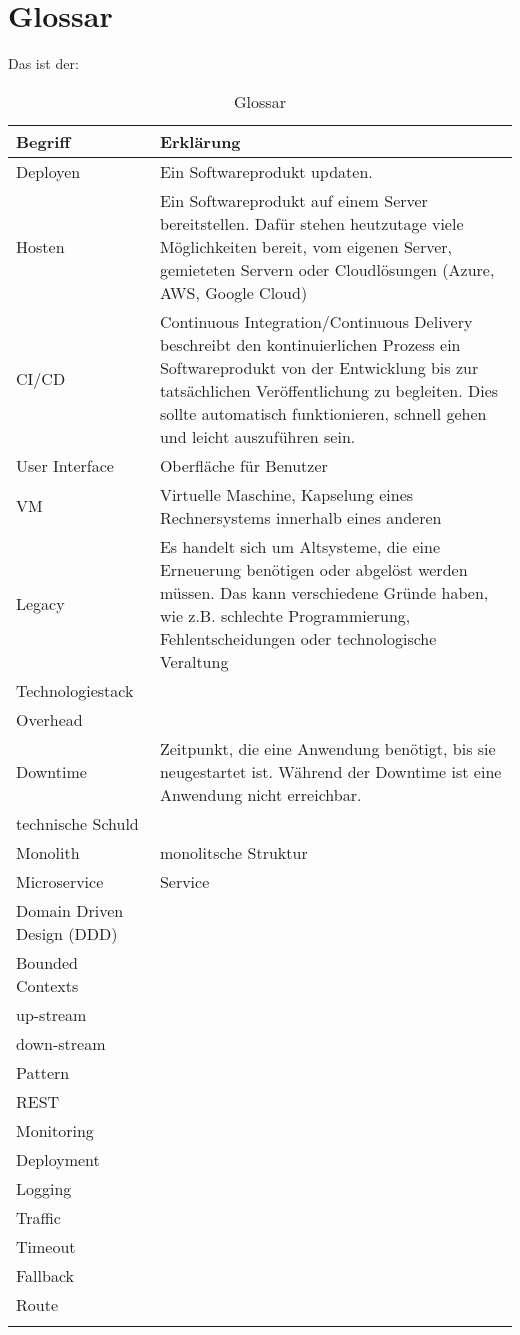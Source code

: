 \section{Glossar}

Das ist der:

	\begin{longtable}[center]{lp{10cm}}
				Begriff & Erklärung \\ \hline
				Deployen & Ein Softwareprodukt updaten.  \\
				Hosten & Ein Softwareprodukt auf einem Server bereitstellen. Dafür stehen heutzutage viele Möglichkeiten bereit, vom eigenen Server, gemieteten Servern oder Cloudlösungen (Azure, AWS, Google Cloud) \\
				CI/CD & Continuous Integration/Continuous Delivery beschreibt den kontinuierlichen Prozess ein Softwareprodukt von der Entwicklung bis zur tatsächlichen Veröffentlichung zu begleiten. Dies sollte automatisch funktionieren, schnell gehen und leicht auszuführen sein.  \\
				User Interface  & Oberfläche für Benutzer  \\
				VM & Virtuelle Maschine, Kapselung eines Rechnersystems innerhalb eines anderen  \\
				Legacy & Es handelt sich um Altsysteme, die eine Erneuerung benötigen oder abgelöst werden müssen. Das kann verschiedene Gründe haben, wie z.B. schlechte Programmierung, Fehlentscheidungen oder technologische Veraltung   \\
				Technologiestack &   \\
				Overhead &   \\
				Downtime & Zeitpunkt, die eine Anwendung benötigt, bis sie neugestartet ist. Während der Downtime ist eine Anwendung nicht erreichbar.  \\
				technische Schuld &   \\
				Monolith & monolitsche Struktur \\
				Microservice & Service  \\	
				Domain Driven Design (DDD) &  \\	
				Bounded Contexts & \\
				up-stream & \\
				down-stream & \\
				Pattern & \\
				REST & \\
				Monitoring & \\
				Deployment & \\
				Logging & \\
				Traffic & \\
				Timeout & \\
				Fallback & \\
				Route & \\
		\caption[Glossar]{Glossar}
	\end{longtable}